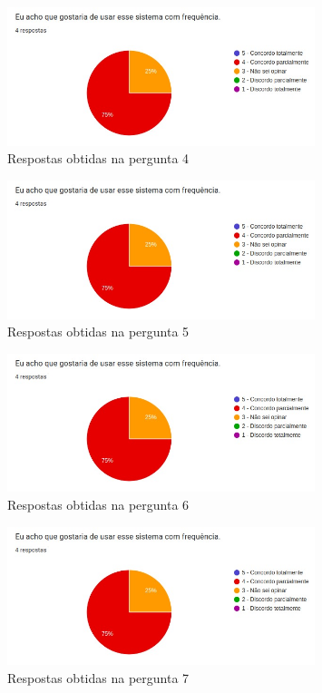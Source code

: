 \documentclass[12pt]{tcc}
\begin{document}
\begin{figure}[!ht]
	\centering
	\includegraphics[width=0.8\textwidth]{figures/respostas-pergunta-4.jpeg}
	\caption{Respostas obtidas na pergunta 4}
	\label{fig:respostas-pergunta-4}
\end{figure}

\begin{figure}[!ht]
	\centering
	\includegraphics[width=0.8\textwidth]{figures/respostas-pergunta-5.jpeg}
	\caption{Respostas obtidas na pergunta 5}
	\label{fig:respostas-pergunta-5}
\end{figure}

\begin{figure}[!ht]
	\centering
	\includegraphics[width=0.8\textwidth]{figures/respostas-pergunta-6.jpeg}
	\caption{Respostas obtidas na pergunta 6}
	\label{fig:respostas-pergunta-6}
\end{figure}

\begin{figure}[!ht]
	\centering
	\includegraphics[width=0.8\textwidth]{figures/respostas-pergunta-7.jpeg}
	\caption{Respostas obtidas na pergunta 7}
	\label{fig:respostas-pergunta-7}
\end{figure}
\end{document}
